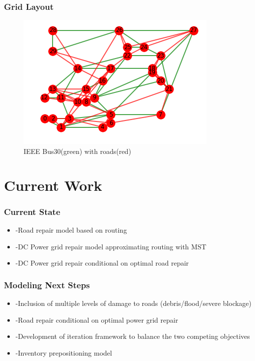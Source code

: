 \documentclass[t, pdftex]{beamer}
\begin{document}
\begin{frame}
\frametitle{Grid Layout}
\begin{figure}
\caption{IEEE Bus30(green) with roads(red) }
\includegraphics[scale=.5]{GridLayout.png}
\end{figure}
\end{frame}
\section{Current Work}
\begin{frame}
\frametitle{Current State}
\begin{itemize}
	\item -Road repair model based on routing
	\item -DC Power grid repair model approximating routing with MST
	\item -DC Power grid repair conditional on optimal road repair
\end{itemize}
\end{frame}
\begin{frame}
\frametitle{Modeling Next Steps}
\begin{itemize}
	\item -Inclusion of multiple levels of damage to roads (debris/flood/severe blockage)
	\item -Road repair conditional on optimal power grid repair
	\item -Development of iteration framework to balance the two competing objectives
	\item -Inventory prepositioning model
\end{itemize}
\end{frame}
\end{document}
